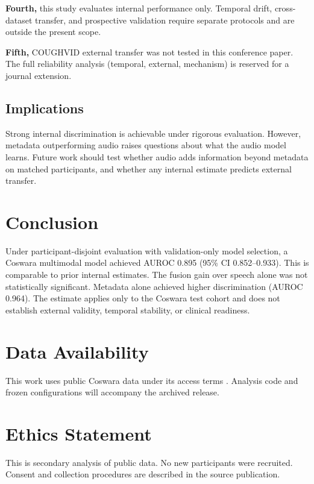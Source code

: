 \documentclass[conference]{IEEEtran}
\begin{document}
\textbf{Fourth,} this study evaluates internal performance only. Temporal drift, cross-dataset transfer, and prospective validation require separate protocols and are outside the present scope.

\textbf{Fifth,} COUGHVID external transfer was not tested in this conference paper. The full reliability analysis (temporal, external, mechanism) is reserved for a journal extension.

\subsection{Implications}

Strong internal discrimination is achievable under rigorous evaluation. However, metadata outperforming audio raises questions about what the audio model learns. Future work should test whether audio adds information beyond metadata on matched participants, and whether any internal estimate predicts external transfer.

\section{Conclusion}

Under participant-disjoint evaluation with validation-only model selection, a Coswara multimodal model achieved AUROC 0.895 (95\% CI 0.852--0.933). This is comparable to prior internal estimates. The fusion gain over speech alone was not statistically significant. Metadata alone achieved higher discrimination (AUROC 0.964). The estimate applies only to the Coswara test cohort and does not establish external validity, temporal stability, or clinical readiness.

\section*{Data Availability}

This work uses public Coswara data under its access terms \cite{bhattacharya2023coswara}. Analysis code and frozen configurations will accompany the archived release.

\section*{Ethics Statement}

This is secondary analysis of public data. No new participants were recruited. Consent and collection procedures are described in the source publication.



\end{document}
